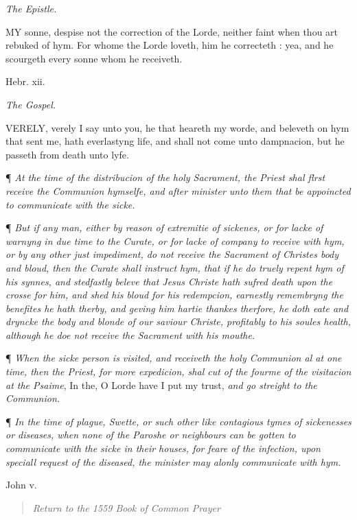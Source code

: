 \emph{The
Epistle.}

MY
sonne, despise not the correction of the Lorde, neither faint when thou
art rebuked of hym. For whome the Lorde loveth, him he correcteth : yea,
and he scourgeth every sonne whom he receiveth.

Hebr. xii.

\emph{The
Gospel.}

VERELY,
verely I say unto you, he that heareth my worde, and beleveth on hym that
sent me, hath everlastyng life, and shall not come unto dampnacion, but
he passeth from death unto lyfe.

¶ \emph{At
the time of the distribucion of the holy Sacrament, the Priest shal flrst
receive the Communion hymselfe, and after minister unto them that be appoincted
to communicate with the sicke.}

¶ \emph{But
if any man, either by reason of extremitie of sickenes, or for lacke of
warnyng in due time to the Curate, or for lacke of company to receive
with hym, or by any other just impediment, do not receive the Sacrament
of Christes body and bloud, then the Curate shall instruct hym, that if
he do truely repent hym of his synnes, and stedfastly beleve that Jesus
Christe hath sufred death upon the crosse for him, and shed his bloud
for his redempcion, earnestly remembryng the benefites he hath therby,
and geving him hartie thankes therfore, he doth eate and dryncke the body
and blonde of our saviour Christe, profitably to his soules health, although
he doe not receive the Sacrament with his mouthe.}

¶ \emph{When
the sicke person is visited, and receiveth the holy Communion al at one
time, then the Priest, for more expedicion, shal cut of the fourme of
the visitacion at the Psaime}, In the, O Lorde have I put my trust,
\emph{and go streight to the Communion.}

¶ \emph{In
the time of plague, Swette, or such other like contagious tymes of sickenesses
or diseases, when none of the Paroshe or neighbours can be gotten to communicate
with the sicke in their houses, for feare of the infection, upon speciall
request of the diseased, the minister may alonly communicate with hym.}

John v.

\begin{quote}

\emph{Return to the 1559
Book of Common Prayer}

\end{quote}

